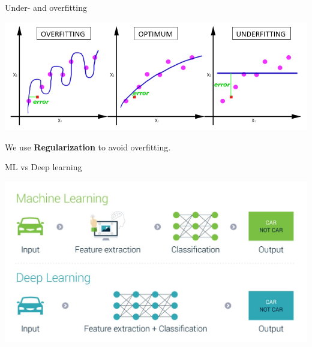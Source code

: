 \documentclass[bigger]{beamer}
\begin{document}
\begin{frame}{Under- and overfitting}
	
	\centering
    \includegraphics[width=.8\textwidth]{fig/underover.png}
    
    We use \textbf{Regularization} to avoid overfitting.
\end{frame}

\begin{frame}{ML vs Deep learning}
	
	\centering
	\includegraphics[width=.8\textwidth]{fig/ml}
\end{frame}
\end{document}

